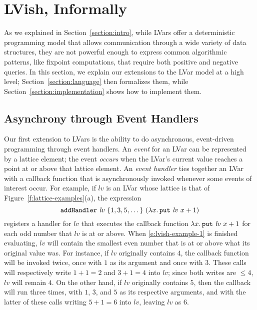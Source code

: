 \section{LVish, Informally}\label{s:quasi-informal}


As we explained in Section~\ref{section:intro}, while LVars offer a deterministic
programming model that allows communication through a wide variety of data structures,
they are not powerful enough to express common algorithmic patterns, like fixpoint
computations, that require both positive and negative queries.  In this section,
we explain our extensions to the LVar model at a high level;
Section~\ref{section:language} then formalizes them, while
Section~\ref{section:implementation} shows how to implement them.

\subsection{Asynchrony through Event Handlers}

Our first extension to LVars is the ability to do asynchronous, event-driven
programming through event handlers.  An \emph{event} for an LVar can be
represented by a lattice element; the event \emph{occurs} when the LVar's
current value reaches a point at or above that lattice element.  An \emph{event handler} ties
together an LVar with a callback function that is asynchronously invoked
whenever some events of interest occur.  For example, if $\mathit{lv}$ is an LVar
whose lattice is that of Figure~\ref{f:lattice-examples}(a), the expression
\begin{equation}
  {\mbox{\texttt{addHandler}}}~\mathit{lv}~\{ 1, 3, 5, \dots \}~(\lambda x.\,\mbox{\texttt{put}}~\mathit{lv}~x+1)
\label{e:lvish-example-1}
\end{equation}
registers a handler for $\mathit{lv}$ that executes the callback
function $\lambda x.\,\mbox{\texttt{put}}~\mathit{lv}~x+1$ for each odd number that
$\mathit{lv}$ is at or above.  When \ref{e:lvish-example-1} is
finished evaluating, $\mathit{lv}$ will contain the smallest even
number that is at or above what its original value was.  For instance,
if $\mathit{lv}$ originally contains $4$, the callback function will
be invoked twice, once with $1$ as its argument and once with $3$.
These calls will respectively write $1+1 = 2$ and $3+1 = 4$ into
$\mathit{lv}$; since both writes are $\leq 4$, $\mathit{lv}$ will
remain $4$.  On the other hand, if $\mathit{lv}$ originally contains
$5$, then the callback will run three times, with $1$, $3$, and $5$ as
its respective arguments, and with the latter of these calls writing
$5+1 = 6$ into $\mathit{lv}$, leaving $\mathit{lv}$ as $6$.

